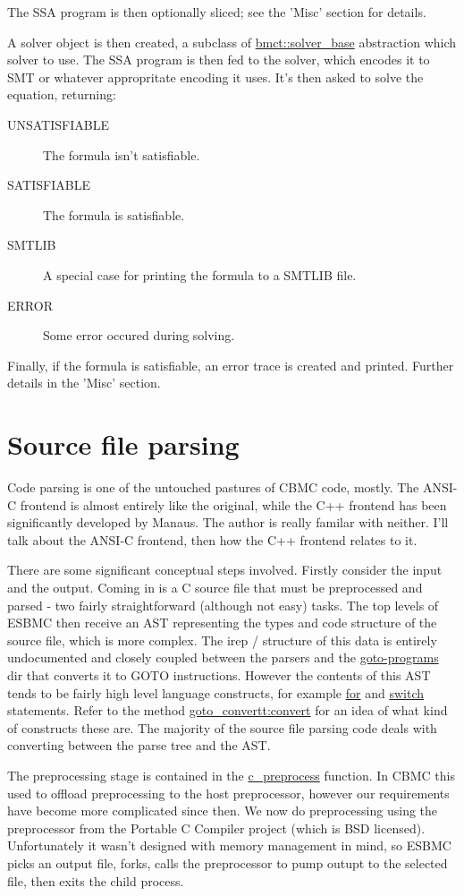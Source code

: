 \documentclass{article}
\begin{document}
The SSA program is then optionally sliced; see the 'Misc' section for details.

A solver object is then created, a subclass of \url{bmct::solver_base}
abstraction which solver to use. The SSA program is then fed to the solver,
which encodes it to SMT or whatever appropritate encoding it uses. It's then
asked to solve the equation, returning:
\begin{description}
\item[UNSATISFIABLE] The formula isn't satisfiable.
\item[SATISFIABLE] The formula is satisfiable.
\item[SMTLIB] A special case for printing the formula to a SMTLIB file.
\item[ERROR] Some error occured during solving.
\end{description}

Finally, if the formula is satisfiable, an error trace is created and printed.
Further details in the 'Misc' section.

\section{Source file parsing}

Code parsing is one of the untouched pastures of CBMC code, mostly. The ANSI-C
frontend is almost entirely like the original, while the C++ frontend has been
significantly developed by Manaus. The author is really familar with neither.
I'll talk about the ANSI-C frontend, then how the C++ frontend relates to it.

There are some significant conceptual steps involved. Firstly consider
the input and the output. Coming in is a C source file that must be preprocessed
and parsed - two fairly straightforward (although not easy) tasks. The top
levels of ESBMC then receive an AST representing the types and code structure
of the source file, which is more complex. The irep / structure of this data
is entirely undocumented and closely coupled between the parsers and the
\url{goto-programs} dir that converts it to GOTO instructions. However the
contents of this AST tends to be fairly high level language constructs,
for example \url{for} and \url{switch} statements. Refer to the method
\url{goto_convertt:convert} for an idea of what kind of constructs these
are. The majority of the source file parsing code deals with converting between
the parse tree and the AST.

The preprocessing stage is contained in the \url{c_preprocess} function.
In CBMC this used to offload preprocessing to the host preprocessor, however
our requirements have become more complicated since then. We now do
preprocessing using the preprocessor from the Portable C Compiler project
(which is BSD licensed). Unfortunately it wasn't designed with memory management
in mind, so ESBMC picks an output file, forks, calls the preprocessor to pump
outupt to the selected file, then exits the child process.
\end{document}
